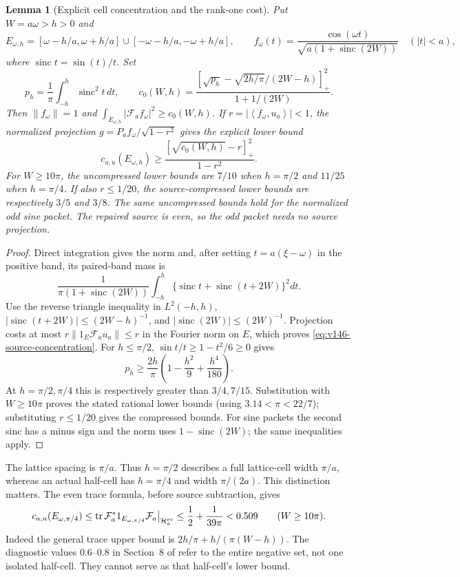 \documentclass[11pt]{article}
\newtheorem{lemma}[theorem]{Lemma}
\theoremstyle{remark}
\newcommand{\norm}[1]{\left\lVert #1\right\rVert}
\newcommand{\ip}[2]{\left\langle #1,#2\right\rangle}
\begin{document}
\begin{lemma}[Explicit cell concentration and the rank-one cost]
\label{lem:v146-packet-concentration}
Put $W=a\omega>h>0$ and
\[
 E_{\omega,h}=[\omega-h/a,\omega+h/a]
                  \cup[-\omega-h/a,-\omega+h/a],\qquad
 f_\omega(t)=\frac{\cos(\omega t)}{\sqrt{a(1+\operatorname{sinc}(2W))}}
                  \quad(|t|<a),
\]
where $\operatorname{sinc}t=\sin(t)/t$. Set
\[
 p_h=\frac1\pi\int_{-h}^h\operatorname{sinc}^2t\,dt,\qquad
 c_0(W,h)=\frac{\left[\sqrt{p_h}
              -\sqrt{2h/\pi}/(2W-h)\right]_+^2}{1+1/(2W)}.
\]
Then $\norm{f_\omega}=1$ and
$\int_{E_{\omega,h}}|\mathcal F_af_\omega|^2\ge c_0(W,h)$.
If $r=|\ip{f_\omega}{u_a}|<1$, the normalized projection
$g=P_af_\omega/\sqrt{1-r^2}$ gives the explicit lower bound
\begin{equation}\label{eq:v146-source-concentration}
 c_{a,u}(E_{\omega,h})\ge
   \frac{[\sqrt{c_0(W,h)}-r]_+^2}{1-r^2}.
\end{equation}
For $W\ge10\pi$, the uncompressed lower bounds are $7/10$ when
$h=\pi/2$ and $11/25$ when $h=\pi/4$. If also $r\le1/20$, the
source-compressed lower bounds are respectively $3/5$ and $3/8$.
The same uncompressed bounds hold for the normalized odd sine packet.
The repaired source is even, so the odd packet needs no source projection.
\end{lemma}
\begin{proof}
Direct integration gives the norm and, after setting
$t=a(\xi-\omega)$ in the positive band, its paired-band mass is
\[
 \frac1{\pi(1+\operatorname{sinc}(2W))}
 \int_{-h}^h\{\operatorname{sinc}t+\operatorname{sinc}(t+2W)\}^2dt.
\]
Use the reverse triangle inequality in $L^2(-h,h)$,
$|\operatorname{sinc}(t+2W)|\le(2W-h)^{-1}$, and
$|\operatorname{sinc}(2W)|\le(2W)^{-1}$. Projection costs at most
$r\norm{1_E\mathcal F_au_a}\le r$ in the Fourier norm on $E$,
which proves \eqref{eq:v146-source-concentration}.
For $h\le\pi/2$, $\sin t/t\ge1-t^2/6\ge0$ gives
\[
 p_h\ge\frac{2h}{\pi}\left(1-\frac{h^2}{9}+\frac{h^4}{180}\right).
\]
At $h=\pi/2,\pi/4$ this is respectively greater than $3/4,7/15$.
Substitution with $W\ge10\pi$ proves the stated rational lower bounds
(using $3.14<\pi<22/7$); substituting $r\le1/20$ gives the compressed
bounds. For sine packets the second sinc has a minus sign and the norm
uses $1-\operatorname{sinc}(2W)$; the same inequalities apply.
\end{proof}

The lattice spacing is $\pi/a$. Thus $h=\pi/2$ describes a full
lattice-cell width $\pi/a$, whereas an actual half-cell has
$h=\pi/4$ and width $\pi/(2a)$. This distinction matters. The even
trace formula, before source subtraction, gives
\begin{equation}\label{eq:v146-halfcell-upper}
 c_{a,u}(E_{\omega,\pi/4})
 \le\operatorname{tr}\mathcal F_a^*1_{E_{\omega,\pi/4}}\mathcal F_a
       \big|_{\mathcal H_a^{\rm ev}}
 \le\frac12+\frac1{39\pi}<0.509\qquad(W\ge10\pi).
\end{equation}
Indeed the general trace upper bound is $2h/\pi+h/(\pi(W-h))$.
The diagnostic values $0.6$--$0.8$ in Section~8 of
 refer to the entire
negative set, not one isolated half-cell. They cannot serve as that
half-cell's lower bound.
\end{document}
